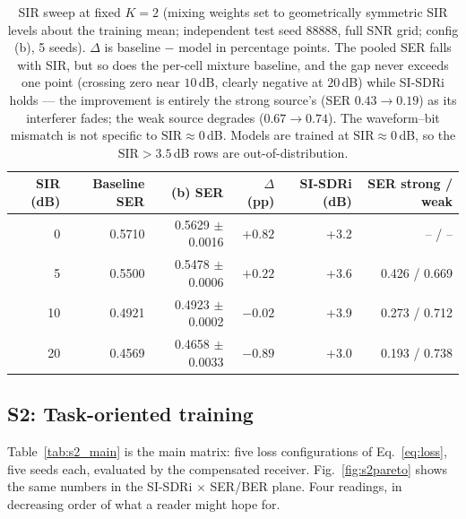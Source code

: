 \documentclass[review,12pt]{elsarticle}
\newcommand{\sir}{\mathrm{SIR}}
\begin{document}
\begin{table}[H]
\centering
\caption{SIR sweep at fixed $K{=}2$ (mixing weights set to geometrically symmetric SIR levels about the training mean; independent test seed 88888, full SNR grid; config (b), 5 seeds). $\Delta$ is baseline $-$ model in percentage points. The pooled SER falls with SIR, but so does the per-cell mixture baseline, and the gap never exceeds one point (crossing zero near $10$\,dB, clearly negative at $20$\,dB) while SI-SDRi holds --- the improvement is entirely the strong source's (SER $0.43 \to 0.19$) as its interferer fades; the weak source degrades ($0.67 \to 0.74$). The waveform--bit mismatch is not specific to $\sir \approx 0$\,dB. Models are trained at $\sir \approx 0$\,dB, so the $\sir > 3.5$\,dB rows are out-of-distribution.}
\label{tab:sir_sweep}
\setlength{\tabcolsep}{4pt}
\footnotesize
\begin{tabular}{r r r r r r}
\toprule
SIR (dB) & Baseline SER & (b) SER & $\Delta$ (pp) & SI-SDRi (dB) & SER strong / weak \\
\midrule
0 & 0.5710 & 0.5629 $\pm$ 0.0016 & $+0.82$ & +3.2 & -- / -- \\
5 & 0.5500 & 0.5478 $\pm$ 0.0006 & $+0.22$ & +3.6 & 0.426 / 0.669 \\
10 & 0.4921 & 0.4923 $\pm$ 0.0002 & $-0.02$ & +3.9 & 0.273 / 0.712 \\
20 & 0.4569 & 0.4658 $\pm$ 0.0033 & $-0.89$ & +3.0 & 0.193 / 0.738 \\
\bottomrule
\end{tabular}
\end{table}

\subsection{S2: Task-oriented training}
\label{sec:s2}

Table~\ref{tab:s2_main} is the main matrix: five loss configurations of
Eq.~\eqref{eq:loss}, five seeds each, evaluated by the compensated
receiver. Fig.~\ref{fig:s2pareto} shows the same numbers in the
SI-SDRi$\,\times\,$SER/BER plane. Four readings, in decreasing order of
what a reader might hope for.
\end{document}
